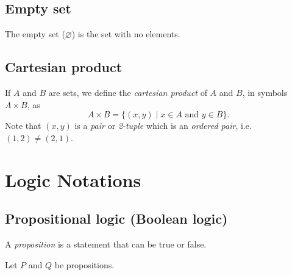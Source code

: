 \documentclass[11pt]{article}
\let\emptyset\varnothing
\begin{document}
    \subsection{Empty set}

    The empty set (\(\emptyset\)) is the set with no elements.

    \subsection{Cartesian product}

    If $A$ and $B$ are sets, we define the \emph{cartesian product} of $A$ and $B$, in symbols \(A \times B\), as \[A \times B = \{(x,y) \mid x \in A \text{ and } y \in B\}.\] Note that \((x,y)\) is a \emph{pair} or \emph{2-tuple} which is an \emph{ordered pair}, i.e. \((1,2) \neq (2,1)\). 

    \pagebreak

    \section{Logic Notations}

    \subsection{Propositional logic (Boolean logic)}

    A \emph{proposition} is a statement that can be true or false.

    \vspace{1em}

    Let $P$ and $Q$ be propositions.

    \vspace{1em}
\end{document}
